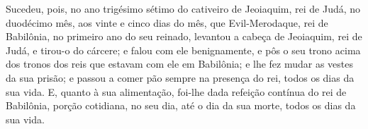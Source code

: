 Sucedeu, pois, no ano trigésimo sétimo do cativeiro de Jeoiaquim,
rei de Judá, no duodécimo mês, aos vinte e cinco dias do mês, que
Evil-Merodaque, rei de Babilônia, no primeiro ano do seu reinado,
levantou a cabeça de Jeoiaquim, rei de Judá, e tirou-o do cárcere;
e falou com ele benignamente, e pôs o seu trono acima dos
tronos dos reis que estavam com ele em Babilônia; e lhe fez
mudar as vestes da sua prisão; e passou a comer pão sempre na
presença do rei, todos os dias da sua vida. E, quanto à sua
alimentação, foi-lhe dada refeição contínua do rei de Babilônia,
porção cotidiana, no seu dia, até o dia da sua morte, todos os dias
da sua vida.

